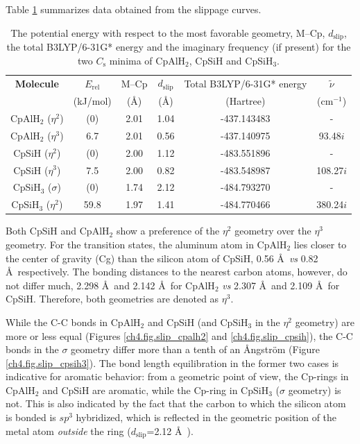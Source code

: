 Table \ref{ch4.tab.slip} summarizes data obtained from the slippage curves.
\begin{table}[htbp]
\center
\caption{The potential energy with respect to the most favorable geometry, M--Cp, $d_\mathrm{slip}$, the total B3LYP/6-31G* energy and the imaginary frequency (if present) for the two $C_\mathrm{s}$ minima of CpAlH$_2$, CpSiH and CpSiH$_3$.}
\begin{tabular}{|c|c|c|c|c|c|}
\hline
\textbf{Molecule}&
$E_\mathrm{rel}$&
M--Cp&
$d_\mathrm{slip}$&Total B3LYP/6-31G* energy &
$\tilde{\nu}$\\
&(kJ/mol)&(\AA)&(\AA)&(Hartree)& (cm$^{-1}$)\\
\hline
CpAlH$_2$ ($\eta^{2}$) & (0)  & 2.01 & 1.04 & -437.143483 & -\\
CpAlH$_2$ ($\eta^{3}$) & 6.7  & 2.01 & 0.56 & -437.140975 & 93.48$i$ \\
CpSiH ($\eta^{2}$) & (0)  & 2.00 & 1.12 & -483.551896 & -\\
CpSiH ($\eta^{3}$) & 7.5  & 2.00 & 0.82 & -483.548987 & 108.27$i$ \\
CpSiH$_3$ ($\sigma$) & (0)  & 1.74 & 2.12 & -484.793270 & - \\
CpSiH$_3$ ($\eta^{2}$) & 59.8 & 1.97 & 1.41 & -484.770466 & 380.24$i$ \\
\hline
\end{tabular}
\label{ch4.tab.slip}
\end{table}
Both CpSiH and CpAlH$_2$ show a preference of the $\eta^{2}$ geometry over the $\eta^{3}$ geometry. For the transition states, the aluminum atom in CpAlH$_2$ lies closer to the center of gravity (Cg) than the silicon atom of CpSiH, 0.56 \AA\ \textit{vs} 0.82 \AA\ respectively. The bonding distances to the nearest carbon atoms, however, do not differ much, 2.298 \AA\ and 2.142 \AA\ for CpAlH$_2$ \textit{vs} 2.307 \AA\ and 2.109 \AA\ for CpSiH. Therefore, both geometries are denoted as $\eta^{3}$.

While the C-C bonds in CpAlH$_2$ and CpSiH (and CpSiH$_3$ in the $\eta^2$ geometry) are more or less equal (Figures \ref{ch4.fig.slip_cpalh2} and \ref{ch4.fig.slip_cpsih}), the C-C bonds in the $\sigma$ geometry differ more than a tenth of an \AA ngstr\"{o}m (Figure \ref{ch4.fig.slip_cpsih3}). The bond length equilibration in the former two cases is indicative for aromatic behavior: from a geometric point of view, the Cp-rings in CpAlH$_2$ and CpSiH are aromatic, while the Cp-ring in CpSiH$_3$ ($\sigma$ geometry) is not. This is also indicated by the fact that the carbon to which the silicon atom is bonded is $sp^3$ hybridized, which is reflected in the geometric position of the metal atom \textit{outside} the ring ($d_\mathrm{slip}$=2.12 \AA\ ). 

